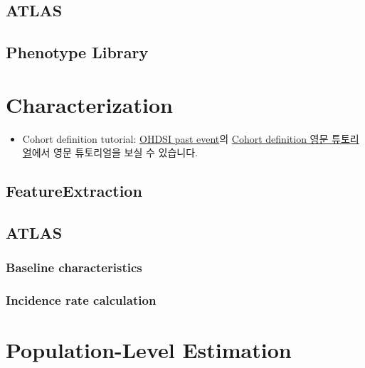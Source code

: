 \documentclass[]{book}
\providecommand{\tightlist}{%
  \setlength{\itemsep}{0pt}\setlength{\parskip}{0pt}}
\begin{document}
\hypertarget{atlas}{%
\section{ATLAS}\label{atlas}}

\hypertarget{phenotype-library}{%
\section{Phenotype Library}\label{phenotype-library}}

\hypertarget{characterization}{%
\chapter{Characterization}\label{characterization}}

\begin{itemize}
\tightlist
\item
  Cohort definition tutorial: \href{https://www.ohdsi.org/past-events/}{OHDSI past event}의 \href{https://www.ohdsi.org/past-events/cohort-definitionphenotyping-tutorial/}{Cohort definition 영문 튜토리얼}에서 영문 튜토리얼을 보실 수 있습니다.
\end{itemize}

\hypertarget{featureextraction}{%
\section{FeatureExtraction}\label{featureextraction}}

\hypertarget{atlas-1}{%
\section{ATLAS}\label{atlas-1}}

\hypertarget{baseline-characteristics}{%
\subsection{Baseline characteristics}\label{baseline-characteristics}}

\hypertarget{incidence-rate-calculation}{%
\subsection{Incidence rate calculation}\label{incidence-rate-calculation}}

\hypertarget{PopulationLevelEstimation}{%
\chapter{Population-Level Estimation}\label{PopulationLevelEstimation}}
\end{document}
